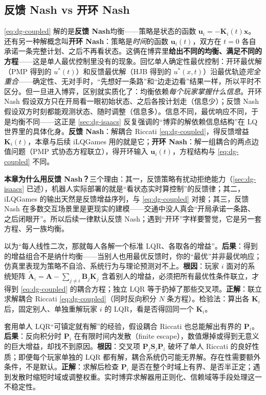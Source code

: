 \subsection{反馈 Nash vs 开环 Nash}
\label{sec:dg-nash-types}
\cref{eq:dg-coupled} 解的是\textbf{反馈 Nash}均衡——策略是状态的函数 $\mathbf u_i=-\mathbf K_i(t)\mathbf x$。还有另一种解概念叫\textbf{开环 Nash}：策略是\emph{时间}的函数 $\mathbf u_i(t)$，双方在 $t=0$ 各自承诺一条完整计划、之后不再看状态。这俩在博弈里\textbf{给出不同的均衡、满足不同的方程}——这是单人最优控制里没有的现象。回忆单人确定性最优控制：开环最优解（PMP 得到的 $u^*(t)$）和反馈最优解（HJB 得到的 $u^*(x,t)$）沿最优轨迹\emph{完全重合}——确定性、无对手时，“先想好一条路”和“边走边看”结果一样，所以平时不区分。但一旦进入博弈，区别就实质化了：均衡依赖\emph{每个玩家掌握什么信息}。开环 Nash 假设双方只在开局看一眼初始状态、之后各按计划走（信息少）；反馈 Nash 假设双方时刻都能观测状态、随时调整（信息多）。信息不同，最优响应不同，于是均衡不同——这正是 \cref{sec:dg-isaacs} 反复强调的“博弈的解依赖信息结构”在 LQ 世界里的具体化身。\textbf{反馈 Nash}：解耦合 Riccati \cref{eq:dg-coupled}，得反馈增益 $\mathbf K_i(t)$，本章与后续 iLQGames 用的就是它；\textbf{开环 Nash}：解一组耦合的两点边值问题（PMP 式协态方程联立），得开环输入 $\mathbf u_i(t)$，方程结构与 \cref{eq:dg-coupled} 不同。

\textbf{本章为什么用反馈 Nash？}\;三个理由：其一，反馈策略有扰动拒绝能力（\cref{sec:dg-isaacs} 已述），机器人实际部署的就是“看状态实时算控制”的反馈律；其二，iLQGames 的输出天然是反馈增益序列，与 \cref{eq:dg-coupled} 对接；其三，反馈 Nash 在多数交互场景里是更现实的建模——交通中没人真会“开局承诺一条路、之后闭眼开”。所以后续一律默认反馈 Nash；遇到“开环”字样要警觉，它是另一套方程、另一族均衡。

\begin{pitfall}
以为“每人线性二次，那就每人各解一个标准 LQR、各取各的增益”。\textbf{后果}：得到的增益组合不是纳什均衡——当别人也用最优反馈时，你的“最优”并非最优响应；仿真里表现为策略不自洽、系统行为与理论预测对不上。\textbf{根因}：玩家 $i$ 面对的系统矩阵 $\tilde{\mathbf A}_i=\mathbf A-\sum_{j\ne i}\mathbf B_j\mathbf K_j$ 含着别人的增益，必须把所有最优性条件联立，才得到 \cref{eq:dg-coupled} 的耦合方程；独立 LQR 等于扔掉了那些交叉项。\textbf{正解}：联立求解耦合 Riccati \cref{eq:dg-coupled}（同时反向积分 $N$ 条方程）。检验法：算出各 $\mathbf K_i$ 后，固定别人、单独重解玩家 $i$ 的 LQR，看是否得回同一个 $\mathbf K_i$。
\end{pitfall}

\begin{pitfall}
套用单人 LQR“可镇定就有解”的经验，假设耦合 Riccati 也总能解出有界的 $\mathbf P_i$。\textbf{后果}：反向积分时 $\mathbf P_i$ 在有限时间内发散（finite escape），数值爆掉或得到无意义的巨大增益，却找不到原因。\textbf{根因}：交叉项 $\mathbf P_j\mathbf S_j\mathbf P_i$ 破坏了单人 Riccati 的良好性质；即便每个玩家单独的 LQR 都有解，耦合系统仍可能无界解。存在性需要额外条件，不是默认。\textbf{正解}：求解后检查 $\mathbf P_i$ 是否在整个时域上有界、是否半正定；遇到发散时缩短时域或调整权重。实时博弈求解器用正则化、信赖域等手段处理这一不稳定性。
\end{pitfall}

